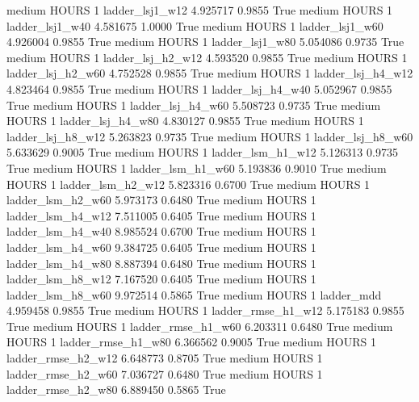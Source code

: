     medium    HOURS                 1        ladder_lsj1_w12   4.925717      0.9855    True
    medium    HOURS                 1        ladder_lsj1_w40   4.581675      1.0000    True
    medium    HOURS                 1        ladder_lsj1_w60   4.926004      0.9855    True
    medium    HOURS                 1        ladder_lsj1_w80   5.054086      0.9735    True
    medium    HOURS                 1      ladder_lsj_h2_w12   4.593520      0.9855    True
    medium    HOURS                 1      ladder_lsj_h2_w60   4.752528      0.9855    True
    medium    HOURS                 1      ladder_lsj_h4_w12   4.823464      0.9855    True
    medium    HOURS                 1      ladder_lsj_h4_w40   5.052967      0.9855    True
    medium    HOURS                 1      ladder_lsj_h4_w60   5.508723      0.9735    True
    medium    HOURS                 1      ladder_lsj_h4_w80   4.830127      0.9855    True
    medium    HOURS                 1      ladder_lsj_h8_w12   5.263823      0.9735    True
    medium    HOURS                 1      ladder_lsj_h8_w60   5.633629      0.9005    True
    medium    HOURS                 1      ladder_lsm_h1_w12   5.126313      0.9735    True
    medium    HOURS                 1      ladder_lsm_h1_w60   5.193836      0.9010    True
    medium    HOURS                 1      ladder_lsm_h2_w12   5.823316      0.6700    True
    medium    HOURS                 1      ladder_lsm_h2_w60   5.973173      0.6480    True
    medium    HOURS                 1      ladder_lsm_h4_w12   7.511005      0.6405    True
    medium    HOURS                 1      ladder_lsm_h4_w40   8.985524      0.6700    True
    medium    HOURS                 1      ladder_lsm_h4_w60   9.384725      0.6405    True
    medium    HOURS                 1      ladder_lsm_h4_w80   8.887394      0.6480    True
    medium    HOURS                 1      ladder_lsm_h8_w12   7.167520      0.6405    True
    medium    HOURS                 1      ladder_lsm_h8_w60   9.972514      0.5865    True
    medium    HOURS                 1             ladder_mdd   4.959458      0.9855    True
    medium    HOURS                 1     ladder_rmse_h1_w12   5.175183      0.9855    True
    medium    HOURS                 1     ladder_rmse_h1_w60   6.203311      0.6480    True
    medium    HOURS                 1     ladder_rmse_h1_w80   6.366562      0.9005    True
    medium    HOURS                 1     ladder_rmse_h2_w12   6.648773      0.8705    True
    medium    HOURS                 1     ladder_rmse_h2_w60   7.036727      0.6480    True
    medium    HOURS                 1     ladder_rmse_h2_w80   6.889450      0.5865    True
